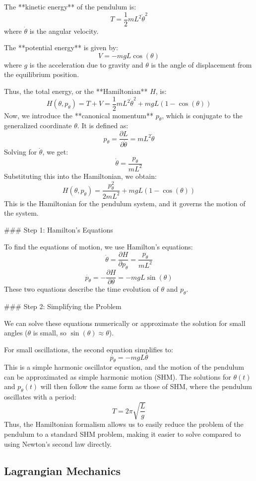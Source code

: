 \documentclass{article}
\begin{document}
The **kinetic energy** of the pendulum is:
\[
T = \frac{1}{2} m L^2 \dot{\theta}^2
\]
where \( \dot{\theta} \) is the angular velocity.

The **potential energy** is given by:
\[
V = -mgL \cos(\theta)
\]
where \( g \) is the acceleration due to gravity and \( \theta \) is the angle of displacement from the equilibrium position.

Thus, the total energy, or the **Hamiltonian** \( H \), is:
\[
H(\theta, p_\theta) = T + V = \frac{1}{2} m L^2 \dot{\theta}^2 + mgL (1 - \cos(\theta))
\]
Now, we introduce the **canonical momentum** \( p_\theta \), which is conjugate to the generalized coordinate \( \theta \). It is defined as:
\[
p_\theta = \frac{\partial L}{\partial \dot{\theta}} = m L^2 \dot{\theta}
\]
Solving for \( \dot{\theta} \), we get:
\[
\dot{\theta} = \frac{p_\theta}{mL^2}
\]
Substituting this into the Hamiltonian, we obtain:
\[
H(\theta, p_\theta) = \frac{p_\theta^2}{2mL^2} + mgL (1 - \cos(\theta))
\]
This is the Hamiltonian for the pendulum system, and it governs the motion of the system.

### Step 1: Hamilton's Equations

To find the equations of motion, we use Hamilton's equations:
\[
\dot{\theta} = \frac{\partial H}{\partial p_\theta} = \frac{p_\theta}{mL^2}
\]
\[
\dot{p_\theta} = -\frac{\partial H}{\partial \theta} = -mgL \sin(\theta)
\]
These two equations describe the time evolution of \( \theta \) and \( p_\theta \).

### Step 2: Simplifying the Problem

We can solve these equations numerically or approximate the solution for small angles (\( \theta \) is small, so \( \sin(\theta) \approx \theta \)).

For small oscillations, the second equation simplifies to:
\[
\dot{p_\theta} = -mgL \theta
\]
This is a simple harmonic oscillator equation, and the motion of the pendulum can be approximated as simple harmonic motion (SHM). The solutions for \( \theta(t) \) and \( p_\theta(t) \) will then follow the same form as those of SHM, where the pendulum oscillates with a period:
\[
T = 2\pi \sqrt{\frac{L}{g}}
\]
Thus, the Hamiltonian formalism allows us to easily reduce the problem of the pendulum to a standard SHM problem, making it easier to solve compared to using Newton's second law directly.

\subsection{Lagrangian Mechanics}
\end{document}
